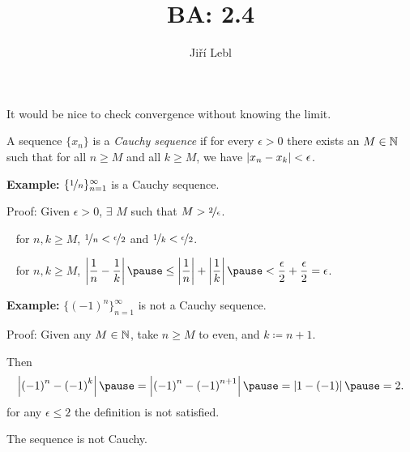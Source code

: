 \documentclass[10pt,aspectratio=149]{beamer}
\author{Ji\v{r}\'i Lebl}
\institute[OSU]{%
Departemento pri Matematiko de Oklahoma {\^S}tata Universitato}
\title{BA: 2.4}
\date{}
\begin{document}
\begin{frame}
\titlepage
\end{frame}

\begin{frame}
It would be nice to check convergence without knowing the limit.

\pause

\begin{definition}
A sequence $\{ x_n \}$ is a \emph{Cauchy sequence}
if for every $\epsilon > 0$ there exists an $M \in {\mathbb{N}}$ such that
for all $n \geq M$ and all $k \geq M$, we have
\quad
$\left\lvert {x_n - x_k} \right\rvert < \epsilon$.
\end{definition}

\pause

\textbf{Example:}
$\{ \nicefrac{1}{n} \}_{n=1}^{\infty}$ is a Cauchy sequence.

\medskip
\pause

Proof:  Given $\epsilon > 0$, $\exists$ $M$ such that
$M > \nicefrac{2}{\epsilon}$.

\pause
\thus~ for $n,k \geq M$, \quad
$\nicefrac{1}{n} < \nicefrac{\epsilon}{2}$
and
$\nicefrac{1}{k} < \nicefrac{\epsilon}{2}$.

\pause
\medskip

\thus ~ for $n, k \geq M$, \quad
$\displaystyle \abs{\frac{1}{n} - \frac{1}{k}}
\pause
\leq
\abs{\frac{1}{n}} + \abs{\frac{1}{k}}
\pause
< \frac{\epsilon}{2} + \frac{\epsilon}{2} = \epsilon$.

\pause
\medskip

\textbf{Example:}
$\bigl\{ {(-1)}^n \bigr\}_{n=1}^\infty$ is not a Cauchy sequence.

\medskip
\pause

Proof:
Given any $M \in {\mathbb{N}}$, take $n \geq M$ to even, and $k \coloneqq n+1$.

\pause
Then
\[
\abs{{(-1)}^n - {(-1)}^k}
\pause
=
\abs{{(-1)}^n - {(-1)}^{n+1}}
\pause
=
\abs{1 - (-1)}
\pause
= 2 .
\]
\pause
\thus
\quad for any $\epsilon \leq 2$ the definition is not satisfied.

\medskip

\thus \quad The sequence is not Cauchy.

%
%
%
%
%
%
\end{frame}
\end{document}
